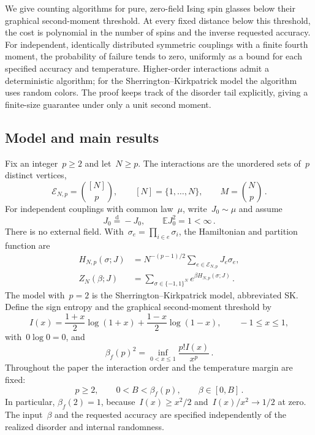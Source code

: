 \documentclass[10pt]{article}
\theoremstyle{plain}
\theoremstyle{definition}
\theoremstyle{remark}
\begin{document}
We give counting algorithms for pure, zero-field Ising spin glasses below their graphical second-moment threshold. At every fixed distance below this threshold, the cost is polynomial in the number of spins and the inverse requested accuracy. For independent, identically distributed symmetric couplings with a finite fourth moment, the probability of failure tends to zero, uniformly as a bound for each specified accuracy and temperature. Higher-order interactions admit a deterministic algorithm; for the Sherrington--Kirkpatrick model the algorithm uses random colors. The proof keeps track of the disorder tail explicitly, giving a finite-size guarantee under only a unit second moment.

\subsection{Model and main results}
Fix an integer~$p\ge2$ and let~$N\ge p$. The interactions are the unordered sets of~$p$ distinct vertices,
\begin{equation*}
 \mathcal E_{N,p}=\binom{[N]}p,\qquad [N]=\{1,\ldots,N\},\qquad M=\binom Np\,.
\end{equation*}
For independent couplings with common law~$\mu$, write~$J_0\sim\mu$ and assume
\begin{equation}\label{eq:disorder}
 J_0\stackrel{\mathrm d}=-J_0,\qquad \mathbb E J_0^2=1<\infty\,.
\end{equation}
There is no external field. With~$\sigma_e=\prod_{i\in e}\sigma_i$, the Hamiltonian and partition function are
\begin{align}
 H_{N,p}(\sigma;J)&=N^{-(p-1)/2}\sum_{e\in\mathcal E_{N,p}}J_e\sigma_e,\label{eq:hamiltonian}\\
 Z_N(\beta;J)&=\sum_{\sigma\in\{-1,1\}^N}e^{\beta H_{N,p}(\sigma;J)}\,.\label{eq:partition}
\end{align}
The model with~$p=2$ is the Sherrington--Kirkpatrick model, abbreviated SK. Define the sign entropy and the graphical second-moment threshold by
\begin{equation*}
 I(x)=\frac{1+x}{2}\log(1+x)+\frac{1-x}{2}\log(1-x),\qquad -1\le x\le1,
\end{equation*}
with~$0\log0=0$, and
\begin{equation}\label{eq:threshold}
 \beta_f(p)^2=\inf_{0<x\le1}\frac{p!I(x)}{x^p}\,.
\end{equation}
Throughout the paper the interaction order and the temperature margin are fixed:
\begin{equation}\label{eq:temperature}
 p\ge2,\qquad 0<B<\beta_f(p),\qquad \beta\in[0,B]\,.
\end{equation}
In particular, $\beta_f(2)=1$, because~$I(x)\ge x^2/2$ and~$I(x)/x^2\to1/2$ at zero. The input~$\beta$ and the requested accuracy are specified independently of the realized disorder and internal randomness.
\end{document}
